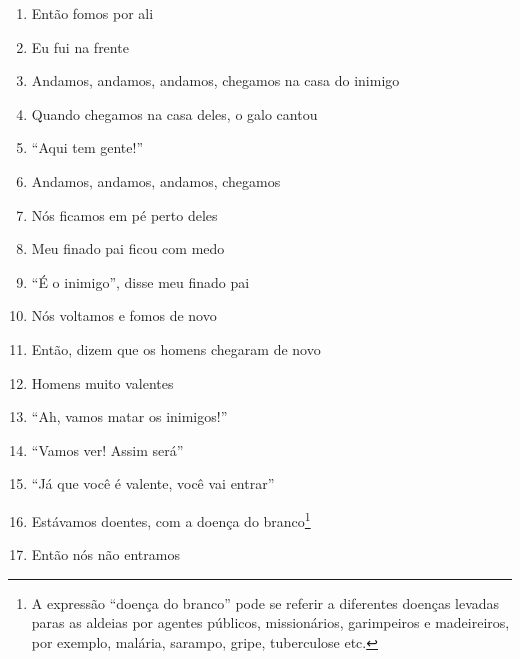 \begin{enumerate}
 \item Então fomos por ali

 \item Eu fui na frente

 \item Andamos, andamos, andamos, chegamos na casa do inimigo

 \item Quando chegamos na casa deles, o galo cantou

 \item ``Aqui tem gente!''

 \begin{center}\end{center}

 \item Andamos, andamos, andamos, chegamos

 \item Nós ficamos em pé perto deles

 \item Meu finado pai ficou com medo

 \item ``É o inimigo'', disse meu finado pai

 \begin{center}\end{center}

 \item Nós voltamos e fomos de novo

 \item Então, dizem que os homens chegaram de novo

 \item Homens muito valentes

 \item ``Ah, vamos matar os inimigos!''

 \item ``Vamos ver! Assim será''

 \item ``Já que você é valente, você vai entrar''

 \item Estávamos doentes, com a doença do branco\footnote{A expressão
   ``doença do branco'' pode se referir a diferentes doenças levadas
   paras as aldeias por agentes públicos, missionários, garimpeiros e
   madeireiros, por exemplo, malária, sarampo, gripe, tuberculose etc.}

 \item Então nós não entramos


\end{enumerate}
